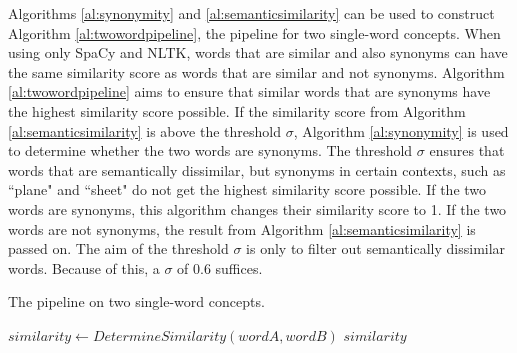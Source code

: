 \documentclass{article}
\begin{document}
Algorithms \ref{al:synonymity} and \ref{al:semanticsimilarity} can be used to construct Algorithm \ref{al:twowordpipeline}, the pipeline for two single-word concepts.  When using only SpaCy and NLTK, words that are similar and also synonyms can have the same similarity score as words that are similar and not synonyms. Algorithm \ref{al:twowordpipeline} aims to ensure that similar words that are synonyms have the highest similarity score possible. If the similarity score from Algorithm \ref{al:semanticsimilarity} is above the threshold $\sigma$, Algorithm \ref{al:synonymity} is used to determine whether the two words are synonyms. The threshold $\sigma$ ensures that words that are semantically dissimilar, but synonyms in certain contexts, such as ``plane" and ``sheet" do not get the highest similarity score possible. If the two words are synonyms, this algorithm changes their similarity score to 1. If the two words are not synonyms, the result from Algorithm \ref{al:semanticsimilarity} is passed on. The aim of the threshold $\sigma$ is only to filter out semantically dissimilar words. Because of this, a $\sigma$ of 0.6 suffices.

\begin{algorithm}
\caption{The pipeline on two single-word concepts.}\label{al:twowordpipeline}
\begin{algorithmic}[1]
		\State $\textit{similarity} \gets \textit{DetermineSimilarity}(wordA, wordB)$
				\State {}
			\EndIf
		\EndIf
		\State \Return $\textit{similarity}$
	\EndProcedure
\end{algorithmic}
\end{algorithm}


\end{document}
